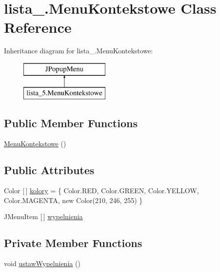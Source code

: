 \hypertarget{classlista__5_1_1_menu_kontekstowe}{}\section{lista\+\_.\+Menu\+Kontekstowe Class Reference}
\label{classlista__5_1_1_menu_kontekstowe}
Inheritance diagram for lista\+\_.\+Menu\+Kontekstowe\+:\begin{figure}[H]
\begin{center}
\leavevmode
\includegraphics[height=2.000000cm]{classlista__5_1_1_menu_kontekstowe}
\end{center}
\end{figure}
\subsection*{Public Member Functions}
\begin{DoxyCompactItemize}
\item 
\mbox{\hyperlink{classlista__5_1_1_menu_kontekstowe_a1ea2acb59485840515086be771eb0d5f}{Menu\+Kontekstowe}} ()
\end{DoxyCompactItemize}
\subsection*{Public Attributes}
\begin{DoxyCompactItemize}
\item 
Color \mbox{[}$\,$\mbox{]} \mbox{\hyperlink{classlista__5_1_1_menu_kontekstowe_ae96bde96586b2e16da0b5d18bc679f4c}{kolory}} = \{ Color.\+R\+ED, Color.\+G\+R\+E\+EN, Color.\+Y\+E\+L\+L\+OW, Color.\+M\+A\+G\+E\+N\+TA, new Color(210, 246, 255) \}
\item 
J\+Menu\+Item \mbox{[}$\,$\mbox{]} \mbox{\hyperlink{classlista__5_1_1_menu_kontekstowe_a95c06de0ee36c780699c2a1efa4b30d0}{wypelnienia}}
\end{DoxyCompactItemize}
\subsection*{Private Member Functions}
\begin{DoxyCompactItemize}
\item 
void \mbox{\hyperlink{classlista__5_1_1_menu_kontekstowe_a374ed94eba427019665e64c496c6bc9b}{ustaw\+Wypelnienia}} ()
\end{DoxyCompactItemize}


